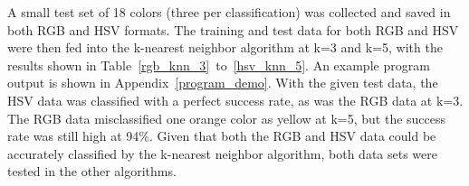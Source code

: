 \documentclass[twoside]{IEEEtran}
\begin{document}
A small test set of 18 colors (three per classification) was collected and saved in both RGB and
HSV formats. The training and test data for both RGB and HSV were then fed into the k-nearest
neighbor algorithm at k=3 and k=5, with the results shown in Table~\ref{rgb_knn_3}~to~\ref{hsv_knn_5}.
An example program output is shown in Appendix~\ref{program_demo}. With the given test data, the HSV data
was classified with a perfect success rate, as was the RGB data at k=3. The RGB data misclassified
one orange color as yellow at k=5, but the success rate was still high at 94\%. Given that both
the RGB and HSV data could be accurately classified by the k-nearest neighbor algorithm, both data
sets were tested in the other algorithms.

\begin{table}[!t]
    \centering


\end{table}
\end{document}

